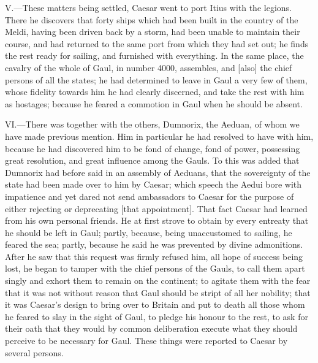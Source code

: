 V.—These matters being settled, Caesar went to port Itius with the
legions. There he discovers that forty ships which had been built in the
country of the Meldi, having been driven back by a storm, had been
unable to maintain their course, and had returned to the same port from
which they had set out; he finds the rest ready for sailing, and
furnished with everything. In the same place, the cavalry of the whole
of Gaul, in number 4000, assembles, and [also] the chief persons of all
the states; he had determined to leave in Gaul a very few of them, whose
fidelity towards him he had clearly discerned, and take the rest with
him as hostages; because he feared a commotion in Gaul when he should be
absent.

VI.—There was together with the others, Dumnorix, the Aeduan, of whom
we have made previous mention. Him in particular he had resolved to have
with him, because he had discovered him to be fond of change, fond of
power, possessing great resolution, and great influence among the Gauls.
To this was added that Dumnorix had before said in an assembly of
Aeduans, that the sovereignty of the state had been made over to him by
Caesar; which speech the Aedui bore with impatience and yet dared not
send ambassadors to Caesar for the purpose of either rejecting or
deprecating [that appointment]. That fact Caesar had learned from his
own personal friends. He at first strove to obtain by every entreaty
that he should be left in Gaul; partly, because, being unaccustomed to
sailing, he feared the sea; partly, because he said he was prevented by
divine admonitions. After he saw that this request was firmly refused
him, all hope of success being lost, he began to tamper with the chief
persons of the Gauls, to call them apart singly and exhort them to
remain on the continent; to agitate them with the fear that it was not
without reason that Gaul should be stript of all her nobility; that it
was Caesar's design to bring over to Britain and put to death all those
whom he feared to slay in the sight of Gaul, to pledge his honour to the
rest, to ask for their oath that they would by common deliberation
execute what they should perceive to be necessary for Gaul. These things
were reported to Caesar by several persons.

